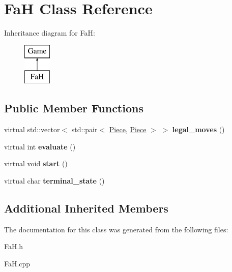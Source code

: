 \hypertarget{class_fa_h}{}\section{FaH Class Reference}
\label{class_fa_h}
Inheritance diagram for FaH\+:\begin{figure}[H]
\begin{center}
\leavevmode
\includegraphics[height=2.000000cm]{class_fa_h}
\end{center}
\end{figure}
\subsection*{Public Member Functions}
\begin{DoxyCompactItemize}
\item 
\mbox{\label{class_fa_h_a6bf4d1735a23a2cf51cfe905c4f437a8}} 
virtual std\+::vector$<$ std\+::pair$<$ \hyperlink{class_piece}{Piece}, \hyperlink{class_piece}{Piece} $>$ $>$ {\bfseries legal\+\_\+moves} ()
\item 
\mbox{\label{class_fa_h_a79788a0309788fed655c77bea2167110}} 
virtual int {\bfseries evaluate} ()
\item 
\mbox{\label{class_fa_h_a21c22430a8fa6d3654cb29244d04d0ab}} 
virtual void {\bfseries start} ()
\item 
\mbox{\label{class_fa_h_a575223df37dc4b747634a7873e399275}} 
virtual char {\bfseries terminal\+\_\+state} ()
\end{DoxyCompactItemize}
\subsection*{Additional Inherited Members}


The documentation for this class was generated from the following files\+:\begin{DoxyCompactItemize}
\item 
Fa\+H.\+h\item 
Fa\+H.\+cpp\end{DoxyCompactItemize}
